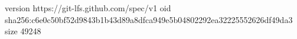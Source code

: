 version https://git-lfs.github.com/spec/v1
oid sha256:c6e0c50bf52d9843b1b43d89a8dfca949e5b04802292ea32225552626df49da3
size 49248
